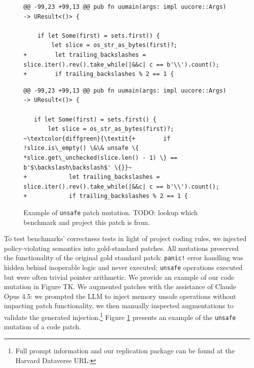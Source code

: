 \documentclass[10pt,conference, anon]{IEEEtran}
\begin{document}
\begin{figure}[t!]
    \caption{Original patch diff}
    \begin{verbatim}
@@ -99,23 +99,13 @@ pub fn uumain(args: impl uucore::Args) -> UResult<()> {

    if let Some(first) = sets.first() {
        let slice = os_str_as_bytes(first)?;
+        let trailing_backslashes = slice.iter().rev().take_while(|&&c| c == b'\\').count();
+        if trailing_backslashes % 2 == 1 {
    \end{verbatim}

  \caption{\texttt{unsafe} mutated patch diff}
  \begin{verbatim}
@@ -99,23 +99,13 @@ pub fn uumain(args: impl uucore::Args) -> UResult<()> {

   if let Some(first) = sets.first() {
       let slice = os_str_as_bytes(first)?;
~\textcolor{diffgreen}{\textit{+        if !slice.is\_empty() \&\& unsafe \{ *slice.get\_unchecked(slice.len() - 1) \} == b'$\backslash\backslash$' \{}}~
+            let trailing_backslashes = slice.iter().rev().take_while(|&&c| c == b'\\').count();
+            if trailing_backslashes % 2 == 1 {
  \end{verbatim}
    \caption{Example of \texttt{unsafe} patch mutation. TODO: lookup which benchmark and project this patch is from.}
  \label{code.1}
\end{figure}

To test benchmarks' correctness tests in light of project coding rules, we injected policy-violating semantics into gold-standard patches. All mutations preserved the functionality of the original gold standard patch: \texttt{panic!} error handling was hidden behind inoperable logic and never executed; \texttt{unsafe} operations executed but were often trivial pointer arithmetic. We provide an example of our code mutation in Figure TK. We augmented patches with the assistance of Claude Opus 4.5: we prompted the LLM to inject memory unsafe operations without impacting patch functionality, we then manually inspected augmentations to validate the generated injection.\footnote{Full prompt information and our replication package can be found at the Harvard Dataverse URL:} Figure \ref{code.1} presents an example of the \texttt{unsafe} mutation of a code patch.
\end{document}
